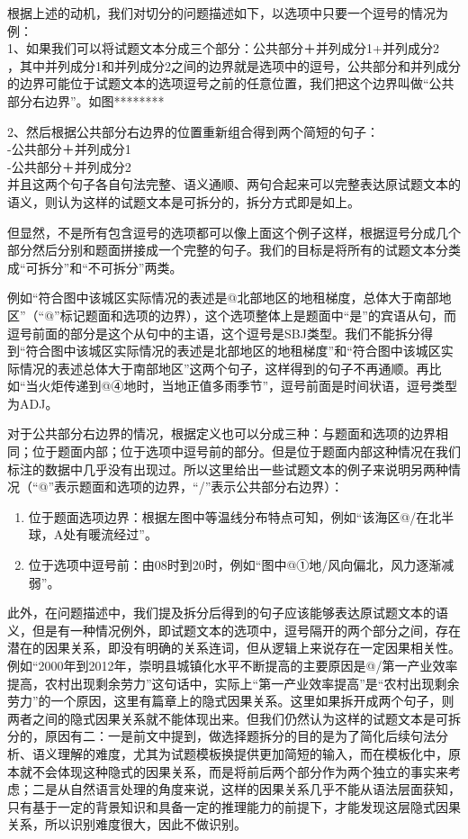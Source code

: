 \documentclass[master, winfont]{njuthesis}
\begin{document}
根据上述的动机，我们对切分的问题描述如下，以选项中只要一个逗号的情况为例：\\
1、如果我们可以将试题文本分成三个部分：公共部分＋并列成分1+并列成分2\\，其中并列成分1和并列成分2之间的边界就是选项中的逗号，公共部分和并列成分的边界可能位于试题文本的选项逗号之前的任意位置，我们把这个边界叫做“公共部分右边界”。如图********

2、然后根据公共部分右边界的位置重新组合得到两个简短的句子：\\
-公共部分＋并列成分1\\
-公共部分＋并列成分2\\
并且这两个句子各自句法完整、语义通顺、两句合起来可以完整表达原试题文本的语义，则认为这样的试题文本是可拆分的，拆分方式即是如上。

但显然，不是所有包含逗号的选项都可以像上面这个例子这样，根据逗号分成几个部分然后分别和题面拼接成一个完整的句子。我们的目标是将所有的试题文本分类成“可拆分”和“不可拆分”两类。

例如“符合图中该城区实际情况的表述是@北部地区的地租梯度，总体大于南部地区”（“@”标记题面和选项的边界），这个选项整体上是题面中“是”的宾语从句，而逗号前面的部分是这个从句中的主语，这个逗号是SBJ类型。我们不能拆分得到“符合图中该城区实际情况的表述是北部地区的地租梯度”和“符合图中该城区实际情况的表述总体大于南部地区”这两个句子，这样得到的句子不再通顺。再比如“当火炬传递到@④地时，当地正值多雨季节”，逗号前面是时间状语，逗号类型为ADJ。

对于公共部分右边界的情况，根据定义也可以分成三种：与题面和选项的边界相同；位于题面内部；位于选项中逗号前的部分。但是位于题面内部这种情况在我们标注的数据中几乎没有出现过。所以这里给出一些试题文本的例子来说明另两种情况（“@”表示题面和选项的边界，“/”表示公共部分右边界）：
\begin{enumerate}
  \item 位于题面选项边界：根据左图中等温线分布特点可知，例如“该海区@/在北半球，A处有暖流经过”。
  \item 位于选项中逗号前：由08时到20时，例如“图中@①地/风向偏北，风力逐渐减弱”。
\end{enumerate}

此外，在问题描述中，我们提及拆分后得到的句子应该能够表达原试题文本的语义，但是有一种情况例外，即试题文本的选项中，逗号隔开的两个部分之间，存在潜在的因果关系，即没有明确的关系连词，但从逻辑上来说存在一定因果相关性。例如“2000年到2012年，崇明县城镇化水平不断提高的主要原因是@/第一产业效率提高，农村出现剩余劳力”这句话中，实际上“第一产业效率提高”是“农村出现剩余劳力”的一个原因，这里有篇章上的隐式因果关系\cite{liyancui2015}。这里如果拆开成两个句子，则两者之间的隐式因果关系就不能体现出来。但我们仍然认为这样的试题文本是可拆分的，原因有二：一是前文中提到，做选择题拆分的目的是为了简化后续句法分析、语义理解的难度，尤其为试题模板换提供更加简短的输入，而在模板化中，原本就不会体现这种隐式的因果关系，而是将前后两个部分作为两个独立的事实来考虑；二是从自然语言处理的角度来说，这样的因果关系几乎不能从语法层面获知，只有基于一定的背景知识和具备一定的推理能力的前提下，才能发现这层隐式因果关系，所以识别难度很大，因此不做识别。
\end{document}
